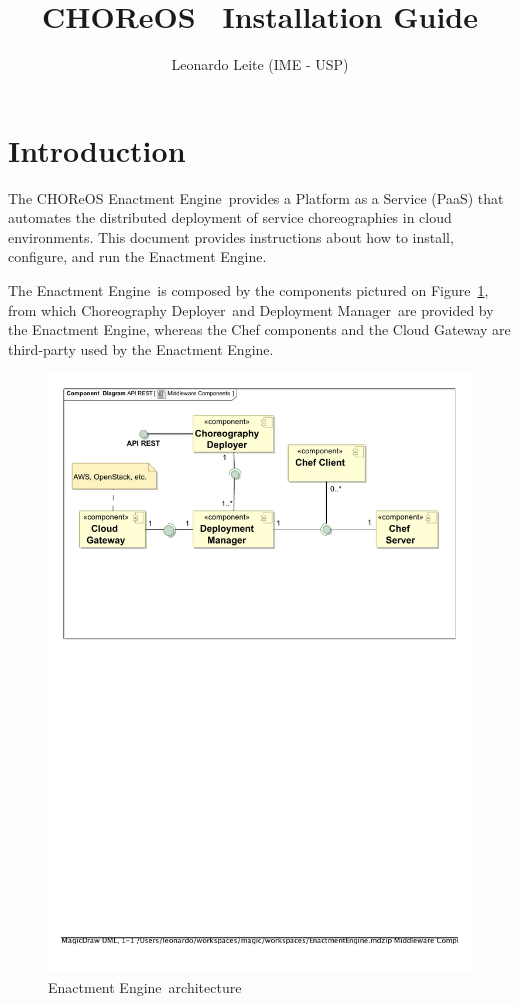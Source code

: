 \documentclass[a4paper, 10pt]{article}
\title{CHOReOS \ee\ Installation Guide}
\author{Leonardo Leite (IME - USP)}
\newcommand{\ee}{Enactment Engine}
\newcommand{\cd}{Choreography Deployer}
\newcommand{\dm}{Deployment Manager}
\begin{document}
\maketitle

\section{Introduction}

The CHOReOS \ee\ provides a Platform as a Service (PaaS) that automates the distributed deployment of service choreographies in cloud environments. This document provides instructions about how to install, configure, and run the \ee.

The \ee\ is composed by the components pictured on Figure~\ref{img:ee_components}, from which \cd\ and \dm\ are provided by the \ee, whereas the Chef components and the Cloud Gateway are third-party used by the \ee.

\begin{figure}
\centering
\includegraphics[scale=0.7]{img/components.pdf}
\caption{\ee\ architecture}
\label{img:ee_components}
\end{figure}
\end{document}

